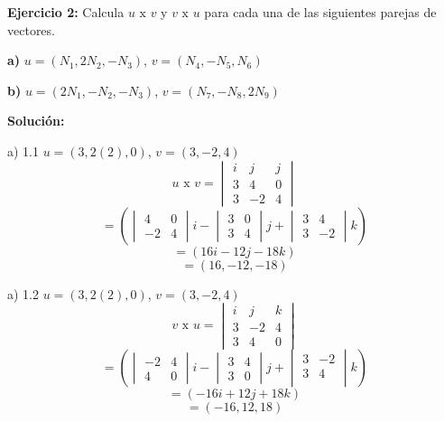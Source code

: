 \documentclass{article}
\begin{document}
\textbf{Ejercicio 2:} Calcula $u\text{ x }v$ y $v\text{ x }u$ para cada una de las siguientes parejas de vectores.    
\vspace{10pt}

\textbf{a)} $u = (N_1, 2N_2, -N_3)$, $v = (N_4, -N_5, N_6)$
\vspace{10pt}

\textbf{b)} $u =(2N_1, -N_2, -N_3)$, $v = (N_7, -N_8, 2N_9)$
\vspace{10pt}

\textbf{Solución:}
\vspace{10pt}


\hspace*{-2cm}\begin{minipage}[c]{6cm}
    a) 1.1 $u = (3, 2(2), 0)$, $v = (3, -2, 4)$
    $$u\text{ x }v = \begin{vmatrix}
        i & j & j \\
        3 & 4 & 0 \\
        3 & -2 & 4
    \end{vmatrix}$$
    $$= \left(\begin{vmatrix}
        4& 0 \\
        -2 & 4 
    \end{vmatrix}i -\begin{vmatrix}
        3 & 0 \\
        3 & 4
    \end{vmatrix}j + \begin{vmatrix}
        3 & 4 \\
        3 & -2 
    \end{vmatrix}k \right)$$
    $$= (16i-12j-18k)$$
    $$=(16, -12, -18)$$
\end{minipage}\hspace*{4cm}\begin{minipage}[c]{6cm}
    a) 1.2  $u = (3, 2(2), 0)$, $v = (3, -2, 4)$
    $$v \text{ x }u = \begin{vmatrix}
        i & j & k \\
        3 & -2 & 4 \\
        3 & 4 & 0
    \end{vmatrix}$$
    $$ = \left(\begin{vmatrix}
        -2 & 4 \\
        4 & 0 
    \end{vmatrix}i - \begin{vmatrix}
        3 & 4 \\
        3 & 0
    \end{vmatrix}j +\begin{vmatrix}
        3 & -2 \\
        3 & 4 \\ 
    \end{vmatrix}k\right)$$
    $$=(-16i+12j +18k)$$
    $$=(-16, 12, 18)$$
\end{minipage}
\vspace{10pt}
\end{document}
